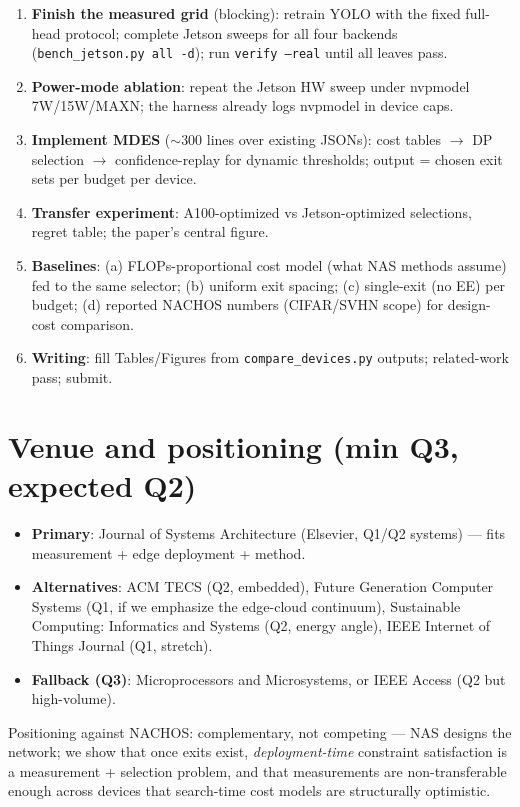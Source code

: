 \documentclass[11pt]{article}
\newcommand{\mdes}{MDES}
\begin{document}
\begin{enumerate}
\item \textbf{Finish the measured grid} (blocking): retrain YOLO with the
fixed full-head protocol; complete Jetson sweeps for all four backends
(\texttt{bench\_jetson.py all -d}); run \texttt{verify --real} until all
leaves pass.
\item \textbf{Power-mode ablation}: repeat the Jetson HW sweep under
nvpmodel 7W/15W/MAXN; the harness already logs nvpmodel in device caps.
\item \textbf{Implement \mdes{}} ($\sim$300 lines over existing JSONs): cost
tables $\to$ DP selection $\to$ confidence-replay for dynamic thresholds;
output = chosen exit sets per budget per device.
\item \textbf{Transfer experiment}: A100-optimized vs Jetson-optimized
selections, regret table; the paper's central figure.
\item \textbf{Baselines}: (a) FLOPs-proportional cost model (what NAS
methods assume) fed to the same selector; (b) uniform exit spacing;
(c) single-exit (no EE) per budget; (d) reported NACHOS numbers
(CIFAR/SVHN scope) for design-cost comparison.
\item \textbf{Writing}: fill Tables/Figures from \texttt{compare\_devices.py}
outputs; related-work pass; submit.
\end{enumerate}

\section{Venue and positioning (min Q3, expected Q2)}

\begin{itemize}
\item \textbf{Primary}: Journal of Systems Architecture (Elsevier, Q1/Q2
systems) --- fits measurement + edge deployment + method.
\item \textbf{Alternatives}: ACM TECS (Q2, embedded), Future Generation
Computer Systems (Q1, if we emphasize the edge-cloud continuum),
Sustainable Computing: Informatics and Systems (Q2, energy angle),
IEEE Internet of Things Journal (Q1, stretch).
\item \textbf{Fallback (Q3)}: Microprocessors and Microsystems, or
IEEE Access (Q2 but high-volume).
\end{itemize}
Positioning against NACHOS: complementary, not competing --- NAS designs the
network; we show that once exits exist, \emph{deployment-time} constraint
satisfaction is a measurement + selection problem, and that measurements are
non-transferable enough across devices that search-time cost models are
structurally optimistic.



\end{document}
